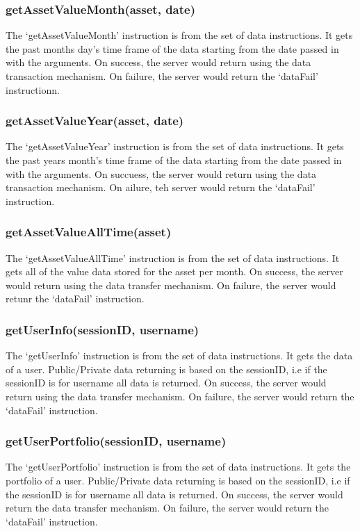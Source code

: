 \documentclass[a4paper]{article}
\begin{document}
\subsubsection{getAssetValueMonth(asset, date)}
The `getAssetValueMonth' instruction is from the set of data instructions. It
gets the past months day's time frame of the data starting from the date passed
in with the arguments. On success, the server would return using the data
transaction mechanism. On failure, the server would return the `dataFail'
instructionn.

\subsubsection{getAssetValueYear(asset, date)}
The `getAssetValueYear' instruction is from the set of data instructions. It
gets the past years month's time frame of the data starting from the date
passed in with the arguments. On succuess, the server would return using the
data transaction mechanism. On ailure, teh server would return the `dataFail'
instruction.

\subsubsection{getAssetValueAllTime(asset)}
The `getAssetValueAllTime' instruction is from the set of data instructions. It
gets all of the value data stored for the asset per month. On success, the
server would return using the data transfer mechanism. On failure, the server
would retunr the `dataFail' instruction.

\subsubsection{getUserInfo(sessionID, username)}
The `getUserInfo' instruction is from the set of data instructions. It gets the
data of a user. Public/Private data returning is based on the sessionID, i.e if
the sessionID is for username all data is returned. On success, the server
would return using the data transfer mechanism. On failure, the server would
return the `dataFail' instruction.

\subsubsection{getUserPortfolio(sessionID, username)}
The `getUserPortfolio' instruction is from the set of data instructions. It
gets the portfolio of a user. Public/Private data returning is based on the
sessionID, i.e if the sessionID is for username all data is returned. On
success, the server would return the data transfer mechanism. On failure, the
server would return the `dataFail' instruction.
\end{document}

